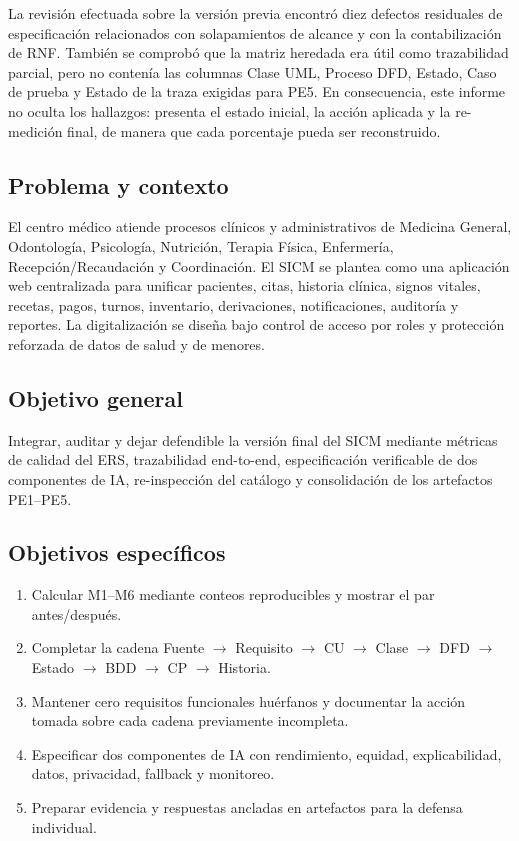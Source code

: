 \documentclass[11pt,a4paper]{article}
\begin{document}
La revisión efectuada sobre la versión previa encontró diez defectos residuales de especificación relacionados con solapamientos de alcance y con la contabilización de RNF. También se comprobó que la matriz heredada era útil como trazabilidad parcial, pero no contenía las columnas Clase UML, Proceso DFD, Estado, Caso de prueba y Estado de la traza exigidas para PE5. En consecuencia, este informe no oculta los hallazgos: presenta el estado inicial, la acción aplicada y la re-medición final, de manera que cada porcentaje pueda ser reconstruido.

\subsection{Problema y contexto}
El centro médico atiende procesos clínicos y administrativos de Medicina General, Odontología, Psicología, Nutrición, Terapia Física, Enfermería, Recepción/Recaudación y Coordinación. El SICM se plantea como una aplicación web centralizada para unificar pacientes, citas, historia clínica, signos vitales, recetas, pagos, turnos, inventario, derivaciones, notificaciones, auditoría y reportes. La digitalización se diseña bajo control de acceso por roles y protección reforzada de datos de salud y de menores.

\subsection{Objetivo general}
Integrar, auditar y dejar defendible la versión final del SICM mediante métricas de calidad del ERS, trazabilidad end-to-end, especificación verificable de dos componentes de IA, re-inspección del catálogo y consolidación de los artefactos PE1--PE5.

\subsection{Objetivos específicos}
\begin{enumerate}[label=OE\arabic*.]
	\item Calcular M1--M6 mediante conteos reproducibles y mostrar el par antes/después.
	\item Completar la cadena Fuente $\rightarrow$ Requisito $\rightarrow$ CU $\rightarrow$ Clase $\rightarrow$ DFD $\rightarrow$ Estado $\rightarrow$ BDD $\rightarrow$ CP $\rightarrow$ Historia.
	\item Mantener cero requisitos funcionales huérfanos y documentar la acción tomada sobre cada cadena previamente incompleta.
	\item Especificar dos componentes de IA con rendimiento, equidad, explicabilidad, datos, privacidad, fallback y monitoreo.
	\item Preparar evidencia y respuestas ancladas en artefactos para la defensa individual.
\end{enumerate}
\end{document}
